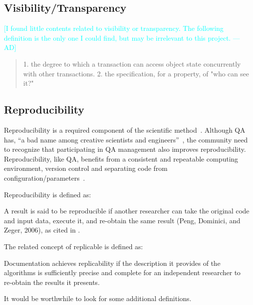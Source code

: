 \documentclass[letterpaper,cleveref]{lipics-v2019}
\newcommand{\authornote}[3]{\textcolor{#1}{[#3 ---#2]}}
\newcommand{\authornote}[3]{}
\newcommand{\ad}[1]{\authornote{cyan}{AD}{#1}} %
\theoremstyle{definition}
\begin{document}
\subsection{Visibility/Transparency}
    \ad{I found little contents related to visibility or transparency. The following definition is the only one I could find, but may be irrelevant to this project.}
    \begin{quotation}
        1. the degree to which a transaction can access object state concurrently with other transactions. 2. the specification, for a property, of "who can see it?"~\cite{ISO/IEC/IEEE24765}
    \end{quotation}
    
\subsection{Reproducibility}

Reproducibility is a required component of the scientific
method~\cite{Davison2012}.  Although QA has, ``a bad name among creative
scientists and engineers''~\cite[p.~352]{Roache1998}, the community need to
recognize that participating in QA management also improves reproducibility.
Reproducibility, like QA, benefits from a consistent and repeatable computing
environment, version control and separating code from
configuration/parameters~\cite{Davison2012}.

Reproducibility is defined as:

A result is said to be reproducible if another researcher can take the original
code and input data, execute it, and re-obtain the same result (Peng, Dominici,
and Zeger, 2006), as cited in \citet{BenureauAndRougier2017}.

The related concept of replicable is defined as:

Documentation achieves replicability if the description it provides of the
algorithms is sufficiently precise and complete for an independent researcher to
re-obtain the results it presents.  \citep{BenureauAndRougier2017}

It would be worthwhile to look for some additional definitions.
\end{document}
